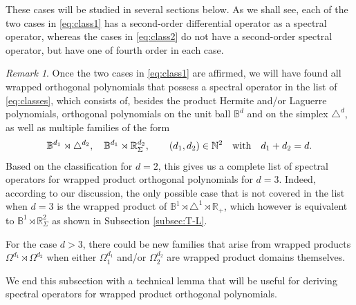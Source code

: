 \documentclass{amsart}
\theoremstyle{remark}
\newtheorem{rem}{Remark}[section]\newtheorem*{notation}{Notation}
\def\Wb{{\bm W}}
\def\BB{{\mathbb B}}
\def\NN{{\mathbb N}}
\def\RR{{\mathbb R}}
\begin{document}
These cases will be studied in several sections below. As we shall see, each of the two cases in 
\eqref{eq:class1} has a second-order differential operator as a spectral operator, whereas the cases 
in \eqref{eq:class2} do not have a second-order spectral operator, but have one of fourth order in each case. 
  
\begin{rem} \label{rem:d=3}
Once the two cases in \eqref{eq:class1} are affirmed, we will have found all wrapped orthogonal polynomials 
that possess a spectral operator in the list of \eqref{eq:classes}, which consists of, besides the product Hermite 
and/or Laguerre polynomials, orthogonal polynomials on the unit ball $\BB^d$ and on the simplex $\triangle^d$, 
as well as multiple families of the form 
$$
   \BB^{d_1} \rtimes \triangle^{d_2}, \quad  \BB^{d_1} \rtimes \RR_\Sigma^{d_2}, \qquad 
     (d_1, d_2) \in \NN^2 \quad \hbox{with} \quad d_1+d_2 = d.
$$ 
Based on the classification for $d =2$, this gives us a complete list of spectral operators for wrapped product 
orthogonal polynomials for $d =3$. Indeed, according to our discussion, the only possible case that is not 
covered in the list when $d = 3$ is the wrapped product of $\BB^1 \rtimes \triangle^1 \rtimes \RR_+$, which 
however is equivalent to $\BB^1 \rtimes \RR_\Sigma^2$ as shown in Subsection \ref{subsec:T-L}. 
\end{rem}

For the case $d > 3$, there could be new families that arise from 
wrapped products $\Omega^{d_1} \rtimes \Omega^{d_2}$ when either $\Omega_1^{d_1}$ 
and/or $\Omega_2^{d_2}$ are wrapped product domains themselves. 
 

We end this subsection with a technical lemma that will be useful for deriving spectral operators for
wrapped product orthogonal polynomials. 
\end{document}
